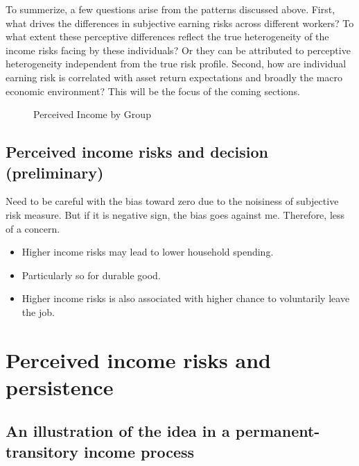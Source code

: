 \documentclass[12pt,notitlepage,onecolumn,aps,pra]{revtex4-1}
\providecommand{\tightlist}{%
      \setlength{\itemsep}{0pt}\setlength{\parskip}{0pt}}
\begin{document}
To summerize, a few questions arise from the patterns discussed above.
First, what drives the differences in subjective earning risks across
different workers? To what extent these perceptive differences reflect
the true heterogeneity of the income risks facing by these individuals?
Or they can be attributed to perceptive heterogeneity independent from
the true risk profile. Second, how are individual earning risk is
correlated with asset return expectations and broadly the macro economic
environment? This will be the focus of the coming sections.


    \begin{figure*}
        \begin{center}\end{center}
        \caption{Perceived Income by Group}
        \label{fig:boxplotbygroup}
    \end{figure*}
    


    \hypertarget{perceived-income-risks-and-decision-preliminary}{%
\subsection{Perceived income risks and decision
(preliminary)}\label{perceived-income-risks-and-decision-preliminary}}

Need to be careful with the bias toward zero due to the noisiness of
subjective risk measure. But if it is negative sign, the bias goes
against me. Therefore, less of a concern.

\begin{itemize}
\tightlist
\item
  Higher income risks may lead to lower household spending.
\item
  Particularly so for durable good.
\item
  Higher income risks is also associated with higher chance to
  voluntarily leave the job.
\end{itemize}

    \hypertarget{perceived-income-risks-and-persistence}{%
\section{Perceived income risks and
persistence}\label{perceived-income-risks-and-persistence}}

\hypertarget{an-illustration-of-the-idea-in-a-permanent-transitory-income-process}{%
\subsection{An illustration of the idea in a permanent-transitory income
process}\label{an-illustration-of-the-idea-in-a-permanent-transitory-income-process}}
\end{document}
